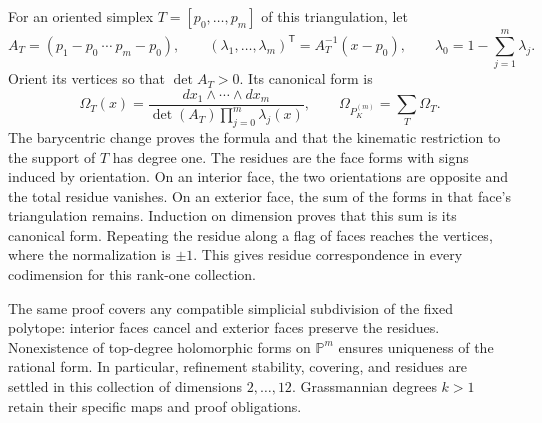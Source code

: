 For an oriented simplex \(T=[p_0,\ldots,p_m]\) of this triangulation,
let
\[
 A_T=(p_1-p_0\ \cdots\ p_m-p_0),\qquad
 (\lambda_1,\ldots,\lambda_m)^\mathsf T=A_T^{-1}(x-p_0),
 \qquad\lambda_0=1-\sum_{j=1}^m\lambda_j.
\]
Orient its vertices so that \(\det A_T>0\).
Its canonical form is
\begin{equation}
 \Omega_T(x)=
 \frac{dx_1\wedge\cdots\wedge dx_m}
 {\det(A_T)\prod_{j=0}^m\lambda_j(x)},\qquad
 \Omega_{P_K^{(m)}}=\sum_{T}\Omega_T.
 \label{eq:polygon-higher-form}
\end{equation}
The barycentric change proves the formula and that the kinematic
restriction to the support of \(T\) has degree one. The residues
are the face forms with signs induced by orientation. On an interior
face, the two orientations are opposite and the total residue vanishes.
On an exterior face, the sum of the forms in that face's triangulation
remains. Induction on dimension proves that this sum is its canonical
form. Repeating the residue along a flag of faces reaches the vertices,
where the normalization is \(\pm1\). This gives residue correspondence
in every codimension for this rank-one collection.

The same proof covers any compatible simplicial subdivision of the
fixed polytope: interior faces cancel and exterior faces preserve the
residues. Nonexistence of top-degree holomorphic forms on
\(\mathbb P^m\) ensures uniqueness of the rational form.
In particular, refinement stability, covering, and residues are
settled in this collection of dimensions \(2,\ldots,12\).
Grassmannian degrees \(k>1\) retain their specific maps and
proof obligations.
